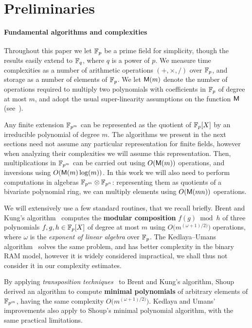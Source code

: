 \documentclass[sigconf]{acmart}
\begin{document}
\section{Preliminaries}
\label{sec:conway}

\paragraph{Fundamental algorithms and complexities}
Throughout this paper we let $\mathbb{F}_p$ be a prime field for simplicity, though the
results easily extend to $\mathbb{F}_q$, where $q$ is a power of $p$. We measure
time complexities as a number of arithmetic operations $(+,\times,/)$
over $\mathbb{F}_p$, and storage as a number of elements of $\mathbb{F}_p$. %
We let $\mathsf{M}(m)$ denote the number of operations required to multiply
two polynomials with coefficients in $\mathbb{F}_p$ of degree at most $m$, and
adopt the usual super-linearity assumptions on the function $\mathsf{M}$
(see~\cite[Ch.~8.3]{vzGG}).

Any finite extension $\mathbb{F}_{p^m}$ can be represented as the quotient of
$\mathbb{F}_p[X]$ by an irreducible polynomial of degree $m$. %
The algorithms we present in the next sections need not assume any
particular representation for finite fields, however when analyzing
their complexities we will assume this representation. %
Then, multiplications in $\mathbb{F}_{p^m}$ can be carried out using
$O(\mathsf{M}(m))$ operations, and inversions using $O(\mathsf{M}(m)\log(m))$. %
In this work we will also need to perform computations in algebras
$\mathbb{F}_{p^m}\otimes\mathbb{F}_{p^n}$: representing them as quotients of a
bivariate polynomial ring, we can multiply elements using $O(\mathsf{M}(mn))$
operations.

We will extensively use a few standard routines, that we recall
briefly. %
Brent and Kung's algorithm~\cite{brent+kung} computes the
\textbf{modular composition} $f(g)\bmod h$ of three polynomials
$f,g,h\in\mathbb{F}_p[X]$ of degree at most $m$ using
$O\bigl(m^{(\omega+1)/2)}\bigr)$ operations, where $\omega$ is the
\emph{exponent of linear algebra} over $\mathbb{F}_p$. %
The Kedlaya--Umans algorithm~\cite{KeUm11} solves the same problem,
and has better complexity in the binary RAM model, however it is
widely considered impractical, we shall thus not consider it in our
complexity estimates.

By applying \emph{transposition
  techniques}~\cite{burgisser+clausen-shokrollahi,bostan+lecerf+schost:tellegen}
to Brent and Kung's algorithm, Shoup~\cite{shoup94,shoup99} derived an
algorithm to compute \textbf{minimal polynomials} of arbitrary
elements of $\mathbb{F}_{p^m}$, having the same complexity
$O\bigl(m^{(\omega+1)/2)}\bigr)$. %
Kedlaya and Umans' improvements also apply to Shoup's minimal
polynomial algorithm, with the same practical limitations.
\end{document}
